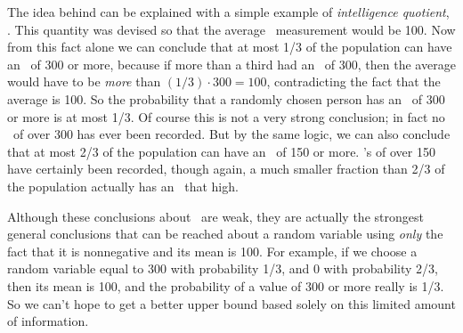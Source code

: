 The idea behind  can be explained with a simple
example of \emph{intelligence quotient}, \idx{\IQ}.  This quantity was
devised so that the average \IQ\ measurement would be 100.  Now from
this fact alone we can conclude that at most 1/3 of the population can
have an \IQ\ of 300 or more, because if more than a third had an
\IQ\ of 300, then the average would have to be \emph{more} than
$(1/3)\cdot 300 = 100$, contradicting the fact that the average is
100.  So the probability that a randomly chosen person has an \IQ\ of
300 or more is at most 1/3.  Of course this is not a very strong
conclusion; in fact no \IQ\ of over 300 has ever been recorded.  But
by the same logic, we can also conclude that at most 2/3 of the
population can have an \IQ\ of 150 or more.  \IQ's of over 150 have
certainly been recorded, though again, a much smaller fraction than
2/3 of the population actually has an \IQ\ that high.

Although these conclusions about \IQ\ are weak, they are actually the
strongest general conclusions that can be reached about a random
variable using \emph{only} the fact that it is nonnegative and its mean is
100.  For example, if we choose a random variable equal to 300 with
probability 1/3, and 0 with probability 2/3, then its mean is 100, and the
probability of a value of 300 or more really is 1/3.  So we can't hope to
get a better upper bound based solely on this limited amount of
information.

